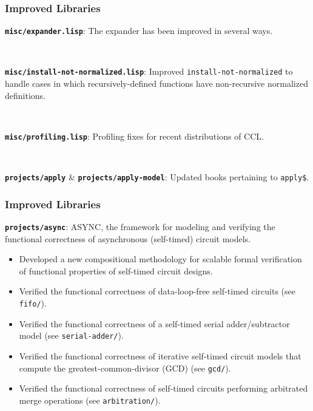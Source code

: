 \documentclass{beamer}
\newcommand{\code}[1]{\texttt{#1}}
\newcommand{\bookpath}[1]{\textbf{\code{#1}}}
\newcommand{\implibtitle}{\frametitle{Improved Libraries}}
\begin{document}

\begin{frame}

\implibtitle

\bookpath{misc/expander.lisp}:
The expander has been improved in several ways.

\

\bookpath{misc/install-not-normalized.lisp}:
Improved \code{install-not-normalized} to handle cases in which
recursively-defined functions have non-recursive normalized
definitions.

\

\bookpath{misc/profiling.lisp}:
Profiling fixes for recent distributions of CCL.

\

\bookpath{projects/apply} \& \bookpath{projects/apply-model}:
Updated books pertaining to \code{apply\$}.

\end{frame}


\begin{frame}

\implibtitle

\bookpath{projects/async}:
ASYNC, the framework for modeling and verifying the functional correctness
of asynchronous (self-timed) circuit models.
\begin{itemize}
\item
Developed a new compositional methodology for scalable formal
verification of functional properties of self-timed circuit designs.
\item
Verified the functional correctness of data-loop-free self-timed
circuits (see \code{fifo/}).
\item
Verified the functional correctness of a self-timed serial
adder/subtractor model (see \code{serial-adder/}).
\item
Verified the functional correctness of iterative self-timed circuit
models that compute the greatest-common-divisor (GCD) (see \code{gcd/}).
\item
Verified the functional correctness of self-timed circuits performing
arbitrated merge operations (see \code{arbitration/}).
\end{itemize}

\end{frame}

\end{document}
